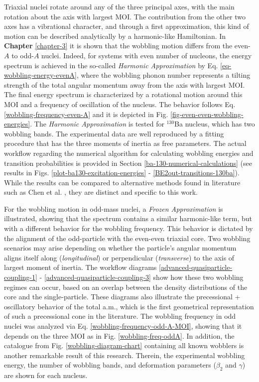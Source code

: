 Triaxial nuclei rotate around any of the three principal axes, with the main rotation about the axis with largest MOI. The contribution from the other two axes has a vibrational character, and through a first approximation, this kind of motion can be described analytically by a harmonic-like Hamiltonian. In \textbf{Chapter} \ref{chapter-3} it is shown that the wobbling motion differs from the even-$A$ to odd-$A$ nuclei. Indeed, for systems with even number of nucleons, the energy spectrum is achieved in the so-called \emph{Harmonic Approximation} by Eq. \eqref{eq-wobbling-energy-evenA}, where the wobbling phonon number represents a tilting strength of the total angular momentum away from the axis with largest MOI. The final energy spectrum is characterized by a rotational motion around this MOI and a frequency of oscillation of the nucleus. The behavior follows Eq. \eqref{wobbling-frequency-even-A} and it is depicted in Fig. \ref{fig-even-even-wobbling-energies}. The \emph{Harmonic Approximation} is tested for $^{130}$Ba nucleus, which has two wobbling bands. The experimental data are well reproduced by a fitting procedure that has the three moments of inertia as free parameters. The actual workflow regarding the numerical algorithm for calculating wobbling energies and transition probabilities is provided in Section \ref{ba-130-numerical-calculations} (see results in Figs. \ref{plot-ba130-excitation-energies} - \ref{BE2out-transitions-130ba}). While the results can be compared to alternative methods found in literature such as Chen et al. \cite{chen2019transverse}, they are distinct and specific to this work.

For the wobbling motion in odd-mass nuclei, a \emph{Frozen Approximation} is illustrated, showing that the spectrum contains a similar harmonic-like term, but with a different behavior for the wobbling frequency. This behavior is dictated by the alignment of the odd-particle with the even-even triaxial core. Two wobbling scenarios may arise depending on whether the particle’s angular momentum aligns itself along (\emph{longitudinal}) or perpendicular (\emph{transverse}) to the axis of largest moment of inertia. The workflow diagrams \ref{advanced-quasiparticle-coupling-1} - \ref{advanced-quasiparticle-coupling-3} show how these two wobbling regimes can occur, based on an overlap between the density distributions of the core and the single-particle. These diagrams also illustrate the precessional + oscillatory behavior of the total a.m., which is the first geometrical representation of such a precessional cone in the literature. The wobbling frequency in odd nuclei was analyzed via Eq. \eqref{wobbling-frequency-odd-A-MOI}, showing that it depends on the three MOI as in Fig. \ref{wobbling-freq-oddA}. In addition, the catalogue from Fig. \ref{wobbling-diagram-chart} containing all known wobblers is another remarkable result of this research. Therein, the experimental wobbling energy, the number of wobbling bands, and deformation parameters ($\beta_2$ and $\gamma$) are shown for each nucleus.

